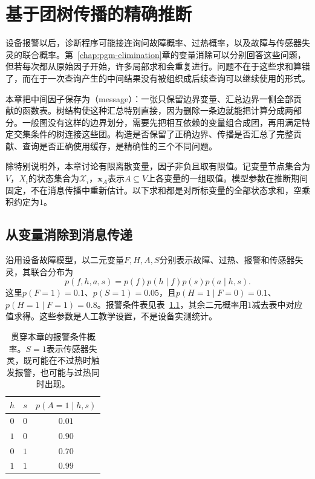 \chapter{基于团树传播的精确推断}
\label{chap:pgm-junction-tree}

设备报警以后，诊断程序可能接连询问故障概率、过热概率，以及故障与传感器失灵的联合概率。第~\ref{chap:pgm-elimination}章的变量消除可以分别回答这些问题，但若每次都从原始因子开始，许多局部求和会重复进行。问题不在于这些求和算错了，而在于一次查询产生的中间结果没有被组织成后续查询可以继续使用的形式。

本章把中间因子保存为（message）：一张只保留边界变量、汇总边界一侧全部贡献的函数表。树结构使这种汇总特别直接，因为删除一条边就能把计算分成两部分。一般图没有这样的边界划分，需要先把相互依赖的变量组合成团，再用满足特定交集条件的树连接这些团。构造是否保留了正确边界、传播是否汇总了完整贡献、查询是否正确使用缓存，是精确性的三个不同问题。

除特别说明外，本章讨论有限离散变量，因子非负且取有限值。记变量节点集合为$V$，$X_i$的状态集合为$\mathcal{X}_i$，$\bm{x}_A$表示$A\subseteq V$上各变量的一组取值。模型参数在推断期间固定，不在消息传播中重新估计。以下求和都是对所标变量的全部状态求和，空乘积约定为$1$。

\section{从变量消除到消息传递}
\label{sec:pgm-junction-tree-from-elimination}

沿用设备故障模型，以二元变量$F,H,A,S$分别表示故障、过热、报警和传感器失灵，其联合分布为
\begin{equation}
  p(f,h,a,s)=p(f)p(h\mid f)p(s)p(a\mid h,s).
  \label{eq:pgm-junction-tree-device}
\end{equation}
这里$p(F=1)=0.1$、$p(S=1)=0.05$，且$p(H=1\mid F=0)=0.1$、$p(H=1\mid F=1)=0.8$。报警条件表见表~\ref{tab:pgm-junction-tree-alarm-cpt}，其余二元概率用$1$减去表中对应值求得。这些参数是人工教学设置，不是设备实测统计。

\begin{table}[htbp]
  \centering
  \begin{tabular}{ccc}
    \toprule
    $h$ & $s$ & $p(A=1\mid h,s)$\\
    \midrule
    $0$ & $0$ & $0.01$\\
    $1$ & $0$ & $0.90$\\
    $0$ & $1$ & $0.70$\\
    $1$ & $1$ & $0.99$\\
    \bottomrule
  \end{tabular}
  \caption{贯穿本章的报警条件概率。$S=1$表示传感器失灵，既可能在不过热时触发报警，也可能与过热同时出现。}
  \label{tab:pgm-junction-tree-alarm-cpt}
\end{table}

